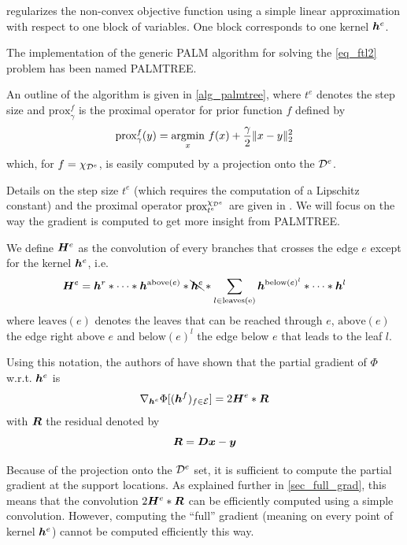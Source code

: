 regularizes the non-convex objective function using a simple linear approximation with respect to one block of variables. One block corresponds to one kernel $\bm{h}^e$.

The implementation of the generic \ac{PALM} algorithm for solving the \eqref{eq_ftl2} problem has been named \ac{PALMTREE}. 

An outline of the algorithm is given in \cref{alg_palmtree}, where $t^e$ denotes the step size and $\text{prox}^f_\gamma$ is the proximal operator for prior function $f$ defined by $$\text{prox}^f_\gamma(y) = \underset{x}{\operatorname{argmin}}~ f(x) + \frac{\gamma}{2} \lVert x - y \rVert^2_2$$ which, for $f = \chi_{{\mathcal D}^e}$, is easily computed by a projection onto the ${\mathcal D}^e$.

Details on the step size $t^e$ (which requires the computation of a Lipschitz constant) and the proximal operator $\text{prox}^{\chi_{{\mathcal D}^e}}_{t^e}$ are given in \cite{chabiron_optimization_2016}. We will focus on the way the gradient is computed to get more insight from \ac{PALMTREE}.

We define $\bm{H}^e$ as the convolution of every branches that crosses the edge $e$ except for the kernel $\bm{h}^e$, i.e. $$\bm{H}^e = \bm{h}^r * \dots * \bm{h}^{\text{above}(e)} * \bcancel{\bm{h}^{e}} * \sum_{l \in \text{leaves(e)}} \bm{h}^{\text{below}(e)^l} * \dots * \bm{h}^{l}$$ where $\text{leaves}(e)$ denotes the leaves that can be reached through $e$, $\text{above}(e)$  the edge right above $e$ and $\text{below}(e)^l$ the edge below $e$ that leads to the leaf $l$.

Using this notation, the authors of \cite{chabiron_optimization_2016} have shown that the partial gradient of $\Phi$ w.r.t. $\bm{h}^e$ is 
$$\nabla_{\bm{h}^e} \Phi[(\bm{h}^f)_{f \in \mathcal E}] = 2 \bm{H}^e * \bm{R}$$ with $\bm{R}$ the residual denoted by
$$\bm{R} = \bm{D}\bm{x} - \bm{y}$$

Because of the projection onto the ${\mathcal D}^e$ set, it is sufficient to compute the partial gradient at the support locations. As explained further in \cref{sec_full_grad}, this means that the convolution $2 \bm{H}^e * \bm{R}$ can be efficiently computed using a simple convolution. However, computing the “full” gradient (meaning on every point of kernel $\bm{h}^e$) cannot be computed efficiently this way.

